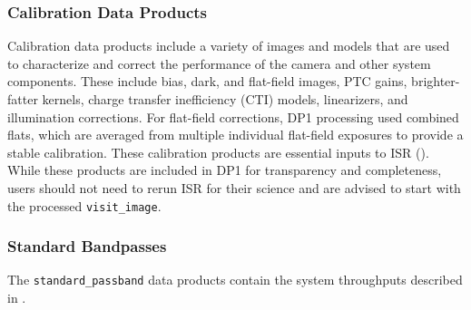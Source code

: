 \subsubsection{Calibration Data Products}
\label{ssec:calibration_data}
Calibration data products include a variety of images and models that are used to characterize and correct the performance of the \gls{camera} and other system components.
These include bias, dark, and flat-field images, PTC gains, brighter-fatter kernels, charge transfer inefficiency (\gls{CTI}) models, linearizers, and illumination corrections.
For flat-field corrections, DP1 processing used combined flats, which are averaged from multiple individual flat-field exposures to provide a stable \gls{calibration}. These \gls{calibration} products are essential inputs to \gls{ISR} (). While these products are included in DP1 for transparency and completeness, users should not need to rerun ISR for their science and are advised to start with the processed \texttt{visit\_image}.

\subsubsection{Standard Bandpasses}
\label{ssec:bandpasses_dataproducts}
The \texttt{standard\_passband} data products contain the system throughputs described in .

% 







